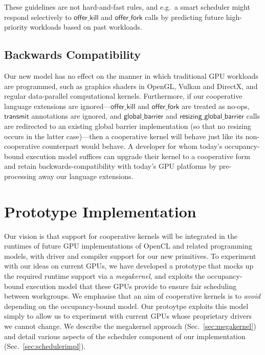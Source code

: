 \documentclass[numbers,nocopyrightspace,10pt]{sigplanconf}
\newcommand{\mysec}{Sec.~}
\newcommand{\transmit}{\mathsf{transmit}}
\newcommand{\offerfork}{\mathsf{offer\_fork}}
\newcommand{\offerkill}{\mathsf{offer\_kill}}
\newcommand{\globalbarrier}{\mathsf{global\_barrier}}
\newcommand{\resizingglobalbarrier}{\mathsf{resizing\_global\_barrier}}
\begin{document}
These guidelines are not hard-and-fast rules, and e.g.\ a smart scheduler might respond selectively to $\offerkill$
and $\offerfork$ calls by predicting future high-priority workloads
based on past workloads.


\subsection{Backwards Compatibility}\label{sec:backwardscompatibility}

Our new model has no effect on the manner in which traditional GPU
workloads are programmed, such as graphics shaders in OpenGL, Vulkan
and DirectX, and regular data-parallel computational kernels.
%
Furthermore, if our cooperative language extensions are
ignored---$\offerkill$ and $\offerfork$ are treated as no-ops,
$\transmit$ annotations are ignored, and $\globalbarrier$ and
$\resizingglobalbarrier$ calls are redirected to an existing global
barrier implementation (so that no resizing occurs in the latter
case)---then a cooperative kernel will behave just like its
non-cooperative counterpart would behave.  A developer
for whom today's occupancy-bound execution model suffices can upgrade
their kernel to a cooperative form and retain backwards-compatibility
with today's GPU platforms by pre-processing away our language
extensions.


\section{Prototype Implementation}\label{sec:implementation}

Our vision is that support for cooperative kernels will be integrated
in the runtimes of future GPU implementations of OpenCL and related
programming models, with driver and compiler support for our new
primitives.  To experiment with our ideas on current GPUs, we have
developed a prototype that mocks up the required runtime support via a
\emph{megakernel}, and exploits the occupancy-bound execution model
that these GPUs provide to ensure fair scheduling between workgroups.
We emphasise that an aim of cooperative kernels is to \emph{avoid}
depending on the occupancy-bound model.  Our protoytpe exploits this
model simply to allow us to experiment with current GPUs whose
proprietary drivers we cannot change.  We describe the megakernel approach (\mysec\ref{sec:megakernel})
and detail various aspects of the scheduler component of our implementation (\mysec\ref{sec:schedulerimpl}).
\end{document}
